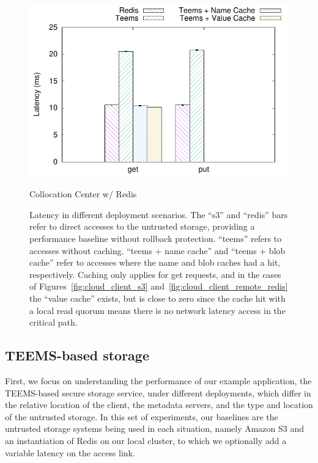 \begin{figure}[t]
\begin{minipage}[t]{0.50\linewidth}
        \includegraphics[width=\linewidth]{teem_results/deployment/result/collocation_center}
        \caption{Collocation Center w/ Redis}\label{fig:coloc_redis}
    \end{minipage}
    \caption{Latency in different deployment scenarios. The
    ``s3'' and ``redis'' bars refer to direct accesses to the
    untrusted storage, providing a performance baseline without
    rollback protection. ``teems'' refers to accesses without
    caching. ``teems + name cache'' and ``teems +
    blob cache'' refer to accesses where the name and blob
    caches had a hit, respectively. Caching only applies for
    get requests, and in the cases of
    Figures~\ref{fig:cloud_client_s3} and~\ref{fig:cloud_client_remote_redis}
    the ``value cache'' exists, but is close to zero since the
    cache hit with a local read quorum means there is no network
    latency access in the critical path.}
\end{figure}



\subsection{\ac{TEEMS}-based storage}\label{ssec:teems_eval_deploy}
First, we focus on understanding the performance of our example
application, the  \ac{TEEMS}-based secure storage service, under
different deployments, which differ in the relative location of
the client, the metadata servers, and the type and location of
the untrusted storage. In this set of experiments, our baselines
are the untrusted
storage systems being used in each situation, namely Amazon S3 and an
instantiation of Redis on our local cluster, to which we optionally
add a variable  latency on the
access link.

